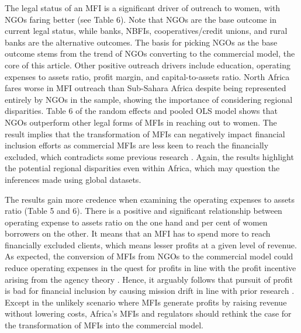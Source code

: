 \documentclass[a4paper,nobind]{templates/ociamthesis}
\begin{document}
The legal status of an MFI is a significant driver of outreach to women, with NGOs faring better (see Table 6). Note that NGOs are the base outcome in current legal status, while banks, NBFIs, cooperatives/credit unions, and rural banks are the alternative outcomes. The basis for picking NGOs as the base outcome stems from the trend of NGOs converting to the commercial model, the core of this article. Other positive outreach drivers include education, operating expenses to assets ratio, profit margin, and capital-to-assets ratio. North Africa fares worse in MFI outreach than Sub-Sahara Africa despite being represented entirely by NGOs in the sample, showing the importance of considering regional disparities. Table 6 of the random effects and pooled OLS model shows that NGOs outperform other legal forms of MFIs in reaching out to women. The result implies that the transformation of MFIs can negatively impact financial inclusion efforts as commercial MFIs are less keen to reach the financially excluded, which contradicts some previous research \autocite{ledgerwood1998microfinance,ledgerwood2006transforming,hartarska2012governance,bos2015practice}. Again, the results highlight the potential regional disparities even within Africa, which may question the inferences made using global datasets.

The results gain more credence when examining the operating expenses to assets ratio (Table 5 and 6). There is a positive and significant relationship between operating expense to assets ratio on the one hand and per cent of women borrowers on the other. It means that an MFI has to spend more to reach financially excluded clients, which means lesser profits at a given level of revenue. As expected, the conversion of MFIs from NGOs to the commercial model could reduce operating expenses in the quest for profits in line with the profit incentive arising from the agency theory \autocite{eisenhardt1989agency}. Hence, it arguably follows that pursuit of profit is bad for financial inclusion by causing mission drift in line with prior research \autocite{wagenaar2012institutional,roberts2013profit,lopatta2016microfinance,mia2017mission}. Except in the unlikely scenario where MFIs generate profits by raising revenue without lowering costs, Africa's MFIs and regulators should rethink the case for the transformation of MFIs into the commercial model.
\end{document}
